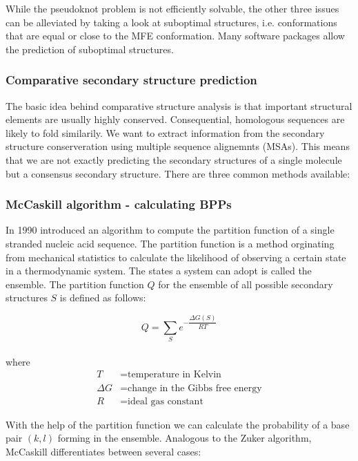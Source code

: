 While the pseudoknot problem is not efficiently solvable, the other three issues can be alleviated by taking a look at suboptimal structures, i.e. conformations that are equal or close to the MFE conformation. Many software packages allow the prediction of suboptimal structures. 

 
\subsubsection{Comparative secondary structure prediction}
The basic idea behind comparative structure analysis is that important structural elements are usually highly conserved. Consequential, homologous sequences are likely to fold similarily. We want to extract information from the secondary structure conserveration using multiple sequence alignemnts (MSAs). This means that we are not exactly predicting the secondary structures of a single molecule but a consensus secondary structure. There are three common methods available: 


\subsubsection{McCaskill algorithm - calculating BPPs}
In 1990 \citeauthor{pmid1695107} introduced an algorithm to compute the partition function of a single stranded nucleic acid sequence. The partition function is a method orginating from  mechanical statistics to calculate the likelihood of observing a certain state in a thermodynamic system. The states a system can adopt is called the ensemble. The partition function $Q$ for the ensemble of all possible secondary structures $S$ is defined as follows\citep{pmid1695107}:  

\begin{equation*}
	Q = \sum_{S} e^{-\dfrac{\Delta G(S)}{RT}}
\end{equation*} \\
where
\begin{equation*}
  \begin{aligned}
	T &= \text{temperature in Kelvin} \\
	\Delta G &= \text{change in the Gibbs free energy} \\
	R &= \text{ideal gas constant}
  \end{aligned}
\end{equation*}

With the help of the partition function we can calculate the probability of a base pair $(k,l)$ forming in the ensemble. Analogous to the Zuker algorithm, McCaskill differentiates between several cases:

